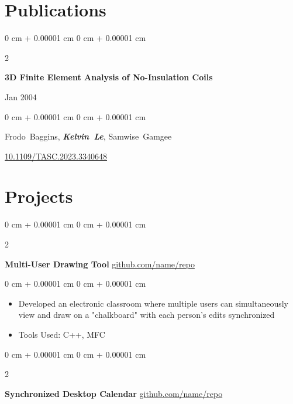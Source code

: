 \documentclass[10pt, letterpaper]{article}
\newenvironment{highlights}{
    \begin{itemize}[
        topsep=0.10 cm,
        parsep=0.10 cm,
        partopsep=0pt,
        itemsep=0pt,
        leftmargin=0 cm + 10pt
    ]
}{
    \end{itemize}
} %
\newenvironment{onecolentry}{
    \begin{adjustwidth}{
        0 cm + 0.00001 cm
    }{
        0 cm + 0.00001 cm
    }
}{
    \end{adjustwidth}
} %
\newenvironment{twocolentry}[2][]{
    \onecolentry
    \def\secondColumn{#2}
    \setcolumnwidth{\fill, 4.5 cm}
    \begin{paracol}{2}
}{
    \switchcolumn \raggedleft \secondColumn
    \end{paracol}
    \endonecolentry
} %
\begin{document}
\section{Publications}

\begin{samepage}
      \begin{twocolentry}{
                  Jan 2004
            }
            \textbf{3D Finite Element Analysis of No-Insulation Coils}
      \end{twocolentry}

      \vspace{0.10 cm}

      \begin{onecolentry}
            \mbox{Frodo Baggins}, \mbox{\textbf{\textit{Kelvin Le}}}, \mbox{Samwise Gamgee}

            \vspace{0.10 cm}

            \href{https://doi.org/10.1109/TASC.2023.3340648}{10.1109/TASC.2023.3340648}
      \end{onecolentry}
\end{samepage}

\section{Projects}

\begin{twocolentry}{
            \href{https://github.com/sinaatalay/rendercv}{github.com/name/repo}
      }
      \textbf{Multi-User Drawing Tool}\end{twocolentry}

\vspace{0.10 cm}
\begin{onecolentry}
      \begin{highlights}
            \item Developed an electronic classroom where multiple users can simultaneously view
            and draw on a "chalkboard" with each person's edits synchronized
            \item Tools Used: C++, MFC
      \end{highlights}
\end{onecolentry}

\vspace{0.2 cm}

\begin{twocolentry}{
            \href{https://github.com/sinaatalay/rendercv}{github.com/name/repo}
      }
      \textbf{Synchronized Desktop Calendar}\end{twocolentry}
\end{document}
